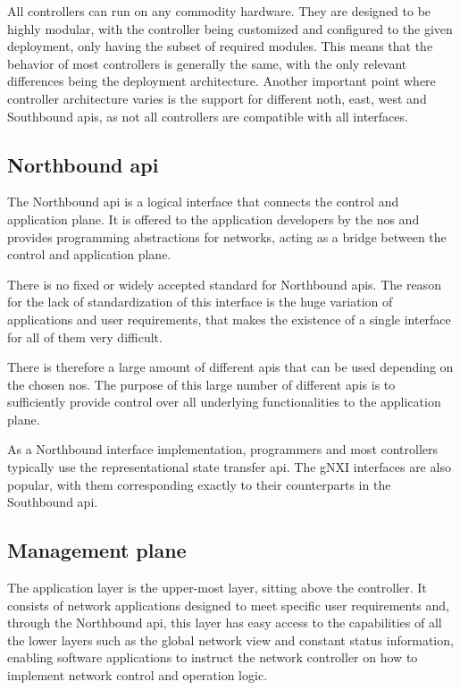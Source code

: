 All controllers can run on any commodity hardware\cite{kreutz_software-defined_2015}. They are designed to be highly modular, with the controller being customized and configured to the given deployment, only having the subset of required modules\cite{peterson_software-defined_2021}. This means that the behavior of most controllers is generally the same, with the only relevant differences being the deployment architecture. Another important point where controller architecture varies is the support for different noth, east, west and Southbound \glspl{api}, as not all controllers are compatible with all interfaces. 

\subsection[Northbound API]{Northbound \gls{api}} %
The Northbound \gls{api} is a logical interface that connects the control and application plane. It is offered to the application developers by the \gls{nos}\cite{kreutz_software-defined_2015} and provides programming abstractions for networks, acting as a bridge between the control and application plane\cite{latif_comprehensive_2020}.

There is no fixed or widely accepted standard for Northbound \glspl{api}\cite{kreutz_software-defined_2015}\cite{latif_comprehensive_2020}. The reason for the lack of standardization of this interface is the huge variation of applications and user requirements, that makes the existence of a single interface for all of them very difficult.

There is therefore a large amount of different \glspl{api} that can be used depending on the chosen \gls{nos}. The purpose of this large number of different \glspl{api} is to sufficiently provide control over all underlying functionalities to the application plane\cite{peterson_software-defined_2021}.

As a Northbound interface implementation, programmers and most controllers typically use the representational state transfer \gls{api}\cite{latif_comprehensive_2020}. The gNXI interfaces are also popular, with them corresponding exactly to their counterparts in the Southbound \gls{api}\cite{peterson_software-defined_2021}. 
        

\subsection{Management plane} %
The application layer is the upper-most layer, sitting above the controller. It consists of network applications designed to meet specific user requirements and, through the Northbound \gls{api}, this layer has easy access to the capabilities of all the lower layers such as the global network view and constant status information, enabling software applications to instruct the network controller on how to implement network control and operation logic\cite{xia_survey_2015}\cite{liatifis_advancing_2023}. 

